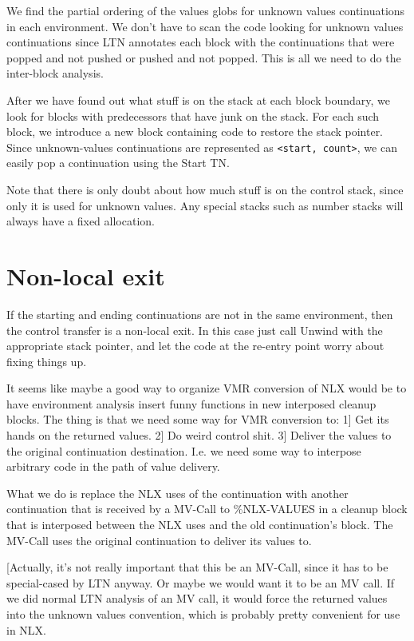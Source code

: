 We find the partial ordering of the values globs for unknown values
continuations in each environment.  We don't have to scan the code looking for
unknown values continuations since LTN annotates each block with the
continuations that were popped and not pushed or pushed and not popped.  This
is all we need to do the inter-block analysis.

After we have found out what stuff is on the stack at each block boundary, we
look for blocks with predecessors that have junk on the stack.  For each such
block, we introduce a new block containing code to restore the stack pointer.
Since unknown-values continuations are represented as \verb+<start, count>+, we can
easily pop a continuation using the Start TN.

Note that there is only doubt about how much stuff is on the control stack,
since only it is used for unknown values.  Any special stacks such as number
stacks will always have a fixed allocation.

\section{Non-local exit}


If the starting and ending continuations are not in the same environment, then
the control transfer is a non-local exit.  In this case just call Unwind with
the appropriate stack pointer, and let the code at the re-entry point worry
about fixing things up.

It seems like maybe a good way to organize VMR conversion of NLX would be to
have environment analysis insert funny functions in new interposed cleanup
blocks.  The thing is that we need some way for VMR conversion to:
 1] Get its hands on the returned values.
 2] Do weird control shit.
 3] Deliver the values to the original continuation destination.
I.e. we need some way to interpose arbitrary code in the path of value
delivery.

What we do is replace the NLX uses of the continuation with another
continuation that is received by a MV-Call to \%NLX-VALUES in a cleanup block
that is interposed between the NLX uses and the old continuation's block.  The
MV-Call uses the original continuation to deliver its values to.  

[Actually, it's not really important that this be an MV-Call, since it has to
be special-cased by LTN anyway.  Or maybe we would want it to be an MV call.
If we did normal LTN analysis of an MV call, it would force the returned values
into the unknown values convention, which is probably pretty convenient for use
in NLX.


